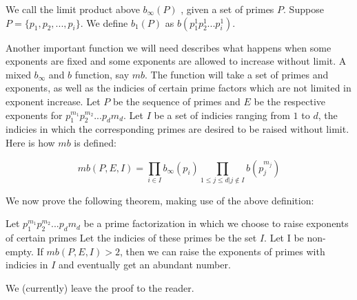 \documentclass[../paper.tex]{article}
\begin{document}
We call the limit product above $b_{\infty}(P)$ , given a set of primes
$P$. Suppose $P = \{p_1, p_2, ..., p_i \}$. We define $b_1(P)$ as
$b(p_1^1 p_2^1 ... p_i^1)$.

Another important function we will need describes what happens 
when some exponents are fixed and some exponents are allowed to
increase without limit. A mixed $b_{\infty}$ and $b$ function, 
say $mb$. The function will take a set of primes and exponents,
as well as the indicies of certain prime factors which are not
limited in exponent increase. Let $P$ be the sequence of primes 
and $E$ be the respective exponents for 
$p_1^{m_1} p_2^{m_2} ... p_d{m_d}$. Let $I$ be a set of indicies
ranging from $1$ to $d$, the indicies in which the corresponding
primes are desired to be raised without limit. Here is how $mb$
is defined:

$$mb(P,E,I) = \prod_{i \in I} b_{\infty}(p_i) 
\prod_{1 \leq j \leq d | j \notin I} b(p_j^{m_j})
$$

We now prove the following theorem, making use of the above definition:

\begin{theorem}
Let $p_1^{m_1} p_2^{m_2} ... p_d{m_d}$ be a prime factorization 
in which we choose to raise exponents of certain primes Let the 
indicies of these primes be the set $I$. Let I be non-empty. If
$mb(P,E,I) > 2$, then we can raise the exponents of primes with 
indicies in $I$ and eventually get an abundant number.
\end{theorem}

We (currently) leave the proof to the reader.
\end{document}
